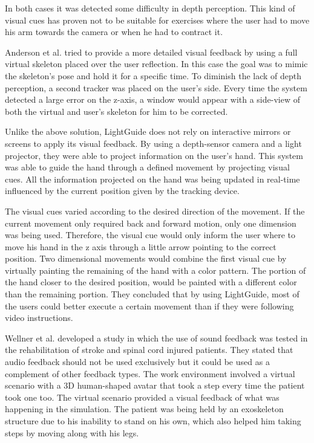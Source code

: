 In both cases it was detected some difficulty in depth perception. 
This kind of visual cues has proven not to be suitable for exercises 
where the user had to move his arm towards the camera or when he had to contract it.

Anderson et al. \cite{Anderson} tried to provide a more detailed visual feedback 
by using a full virtual skeleton placed over the user reflection. In this case the goal 
was to mimic the skeleton's pose and hold it for a specific time.
To diminish the lack of depth perception, a second tracker was placed on the user's side. 
Every time the system detected a large error on the z-axis, a window would appear with a 
side-view of both the virtual and user's skeleton for him to be corrected.

Unlike the above solution, LightGuide \cite{Sodhi2012} does not rely on interactive mirrors or screens to 
apply its visual feedback. By using a depth-sensor camera and a light projector, they were able 
to project information on the user's hand. This system was able to guide the hand through a defined 
movement by projecting visual cues. All the information projected on 
the hand was being updated in real-time influenced by the current position given by the tracking device.

The visual cues varied according to the desired direction of the movement. 
If the current movement only required back and forward motion, only one dimension was being used. 
Therefore, the visual cue would only inform the user where to move his 
hand in the z axis through a little arrow pointing to the correct position.
Two dimensional movements would combine the first visual cue by virtually painting the
remaining of the hand with a color pattern. The portion of the hand closer to the
desired position, would be painted with a different color than the remaining portion.
They concluded that by using LightGuide, most of the users could better execute a certain 
movement than if they were following video instructions.

Wellner et al. \cite{Wellner2007a} developed a study in which the use of sound feedback was tested in the rehabilitation
of stroke and spinal cord injured patients. They stated that audio feedback should not be used exclusively but it 
could be used as a complement of other feedback types.
The work environment involved a virtual scenario with a 3D human-shaped avatar that took a step every time the
patient took one too. The virtual scenario provided a visual feedback of what was happening in the simulation.
The patient was being held by an exoskeleton structure due to his inability to stand on his 
own, which also helped him taking steps by moving along with his legs. 

